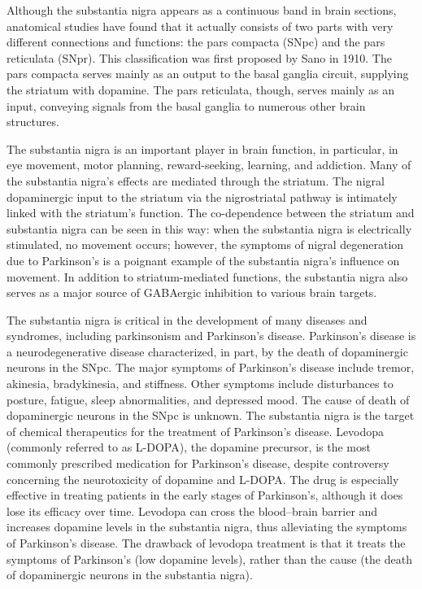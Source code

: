 \documentclass[]{book}
\begin{document}
Although the substantia nigra appears as a continuous band in brain sections, anatomical studies have found that it actually consists of two parts with very different connections and functions: the pars compacta (SNpc) and the pars reticulata (SNpr). This classification was first proposed by Sano in 1910. The pars compacta serves mainly as an output to the basal ganglia circuit, supplying the striatum with dopamine. The pars reticulata, though, serves mainly as an input, conveying signals from the basal ganglia to numerous other brain structures.

The substantia nigra is an important player in brain function, in particular, in eye movement, motor planning, reward-seeking, learning, and addiction. Many of the substantia nigra's effects are mediated through the striatum. The nigral dopaminergic input to the striatum via the nigrostriatal pathway is intimately linked with the striatum's function. The co-dependence between the striatum and substantia nigra can be seen in this way: when the substantia nigra is electrically stimulated, no movement occurs; however, the symptoms of nigral degeneration due to Parkinson's is a poignant example of the substantia nigra's influence on movement. In addition to striatum-mediated functions, the substantia nigra also serves as a major source of GABAergic inhibition to various brain targets.

The substantia nigra is critical in the development of many diseases and syndromes, including parkinsonism and Parkinson's disease.
Parkinson's disease is a neurodegenerative disease characterized, in part, by the death of dopaminergic neurons in the SNpc. The major symptoms of Parkinson's disease include tremor, akinesia, bradykinesia, and stiffness. Other symptoms include disturbances to posture, fatigue, sleep abnormalities, and depressed mood. The cause of death of dopaminergic neurons in the SNpc is unknown. The substantia nigra is the target of chemical therapeutics for the treatment of Parkinson's disease. Levodopa (commonly referred to as L-DOPA), the dopamine precursor, is the most commonly prescribed medication for Parkinson's disease, despite controversy concerning the neurotoxicity of dopamine and L-DOPA. The drug is especially effective in treating patients in the early stages of Parkinson's, although it does lose its efficacy over time. Levodopa can cross the blood--brain barrier and increases dopamine levels in the substantia nigra, thus alleviating the symptoms of Parkinson's disease. The drawback of levodopa treatment is that it treats the symptoms of Parkinson's (low dopamine levels), rather than the cause (the death of dopaminergic neurons in the substantia nigra).
\end{document}

